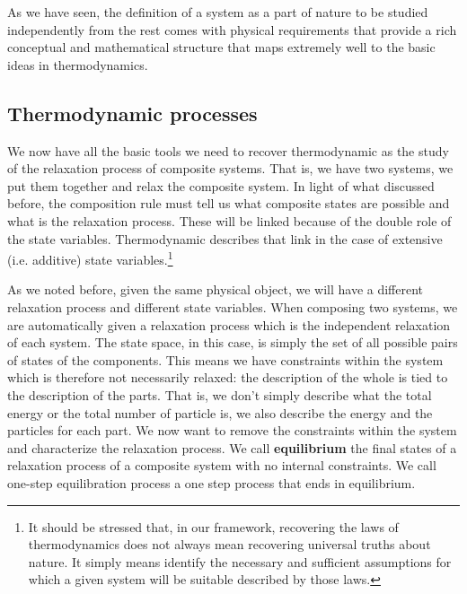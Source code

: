 \documentclass[letterpaper]{article}
\begin{document}
As we have seen, the definition of a system as a part of nature to be studied independently from the rest comes with physical requirements that provide a rich conceptual and mathematical structure that maps extremely well to the basic ideas in thermodynamics.

\subsection{Thermodynamic processes}

We now have all the basic tools we need to recover thermodynamic as the study of the relaxation process of composite systems. That is, we have two systems, we put them together and relax the composite system. In light of what discussed before, the composition rule must tell us what composite states are possible and what is the relaxation process. These will be linked because of the double role of the state variables. Thermodynamic describes that link in the case of extensive (i.e. additive) state variables.\footnote{It should be stressed that, in our framework, recovering the laws of thermodynamics does not always mean recovering universal truths about nature. It simply means identify the necessary and sufficient assumptions for which a given system will be suitable described by those laws.}

As we noted before, given the same physical object, we will have a different relaxation process and different state variables. When composing two systems, we are automatically given a relaxation process which is the independent relaxation of each system. The state space, in this case, is simply the set of all possible pairs of states of the components. This means we have constraints within the system which is therefore not necessarily relaxed: the description of the whole is tied to the description of the parts. That is, we don't simply describe what the total energy or the total number of particle is, we also describe the energy and the particles for each part. We now want to remove the constraints within the system and characterize the relaxation process. We call \textbf{equilibrium} the final states of a relaxation process of a composite system with no internal constraints. We call one-step equilibration process a one step process that ends in equilibrium.
\end{document}
